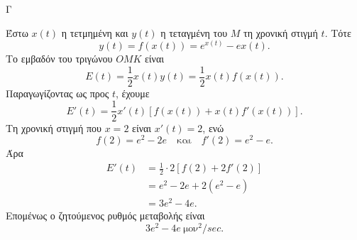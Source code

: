 \begin{thema}{Γ}
\begin{erwthma}
\item Έστω $x(t)$ η τετμημένη και $y(t)$ η τεταγμένη του $M$ τη χρονική στιγμή $t$. Τότε
\[
y(t)=f(x(t))=e^{x(t)}-ex(t).
\]
Το εμβαδόν του τριγώνου $OMK$ είναι
\[
E(t)=\frac{1}{2}x(t)y(t)=\frac{1}{2}x(t)f(x(t)).
\]
Παραγωγίζοντας ως προς $t$, έχουμε
\[
E'(t)=\frac{1}{2}x'(t)\left[f(x(t))+x(t)f'(x(t))\right].
\]
Τη χρονική στιγμή που $x=2$ είναι $x'(t)=2$, ενώ
\[
f(2)=e^2-2e
\quad\text{και}\quad
f'(2)=e^2-e.
\]
Άρα
\begin{align*}
E'(t)&=\frac{1}{2}\cdot2\left[f(2)+2f'(2)\right]\\
&=e^2-2e+2(e^2-e)\\
&=3e^2-4e.
\end{align*}
Επομένως ο ζητούμενος ρυθμός μεταβολής είναι
\[
{3e^2-4e\ \text{μον}^2/\si{sec}}.
\]
\end{erwthma}
\end{thema}

